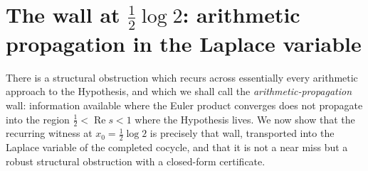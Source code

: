 \documentclass[11pt]{amsart}
\theoremstyle{definition}
\theoremstyle{remark}
\theoremstyle{definition}
\renewcommand{\Re}{\operatorname{Re}}
\newcommand{\half}{\tfrac{1}{2}}
\begin{document}
\section{The wall at $\tfrac12\log2$: arithmetic propagation in the Laplace variable}
\label{sec:halflog2}

There is a structural obstruction which recurs across essentially every arithmetic approach to the
Hypothesis, and which we shall call the \emph{arithmetic-propagation} wall: information available
where the Euler product converges does not propagate into the region $\half<\Re s<1$ where the
Hypothesis lives. We now show that the
recurring witness at $x_0=\tfrac12\log2$ is precisely that wall, transported into the Laplace
variable of the completed cocycle, and that it is not a near miss but a robust structural
obstruction with a closed-form certificate.
\end{document}
